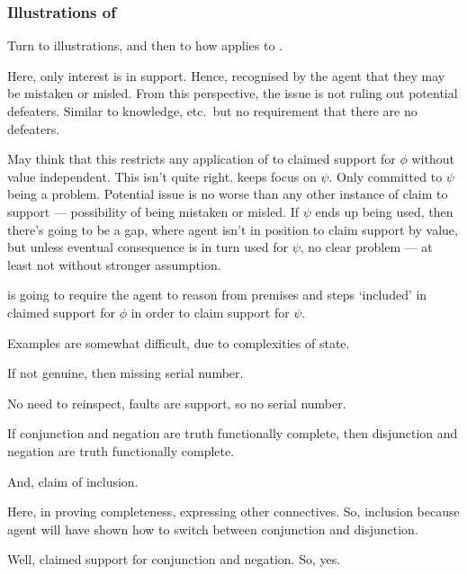 \subsubsection{Illustrations of \nI{}}
\label{sec:illustrations-ni}

\begin{note}
  Turn to illustrations, and then to how \nI{} applies to \gsi{}.
\end{note}

\begin{note}
  Here, only interest is in support.
  Hence, recognised by the agent that they may be mistaken or misled.
  From this perspective, the issue is not ruling out potential defeaters.
  Similar to knowledge, etc.\ but no requirement that there are no defeaters.
\end{note}

\begin{note}
  May think that this restricts any application of \RBV{} to claimed support for \(\phi\) without value independent.
  This isn't quite right.
  \eiS{} keeps focus on \(\psi\).
  Only committed to \(\psi\) being a problem.
  Potential issue is no worse than any other instance of claim to support --- possibility of being mistaken or misled.
  If \(\psi\) ends up being used, then there's going to be a gap, where agent isn't in position to claim support by value, but unless eventual consequence is in turn used for \(\psi\), no clear problem --- at least not without stronger assumption.
\end{note}

\begin{note}
  \ESU{} is going to require the agent to reason from premises and steps `included' in claimed support for \(\phi\) in order to claim support for \(\psi\).
\end{note}


\begin{note}[Examples]
  Examples are somewhat difficult, due to complexities of state.
\end{note}

\begin{note}
  \begin{illustration}
    If not genuine, then missing serial number.
  \end{illustration}
  No need to reinspect, faults are support, so no serial number.
\end{note}

\begin{note}
  \begin{illustration}
    If conjunction and negation are truth functionally complete, then disjunction and negation are truth functionally complete.

    And, claim of inclusion.
  \end{illustration}

  Here, in proving completeness, expressing other connectives.
  So, inclusion because agent will have shown how to switch between conjunction and disjunction.

  Well, claimed support for conjunction and negation.
  So, yes.
\end{note}

